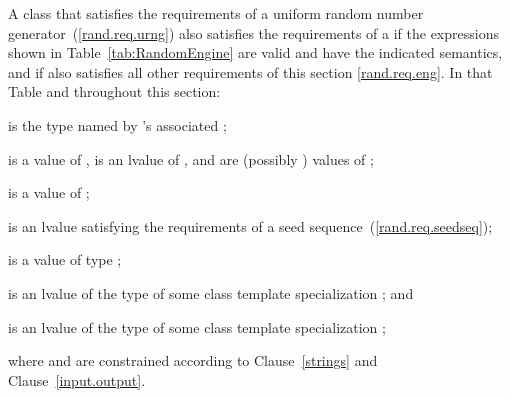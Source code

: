 \pnum
A class 
that satisfies the requirements
of a uniform random number generator~(\ref{rand.req.urng})
also satisfies the requirements
of a 
if the expressions shown
in Table~\ref{tab:RandomEngine}
are valid and have the indicated semantics,
and if  also satisfies all other requirements
of this section \ref{rand.req.eng}.
In that Table and throughout this section:
\begin{enumeratea}
  \item
     is the type named by
    's associated ;
  \item
     is a value of ,
     is an lvalue of ,
     and  are (possibly ) values of ;
  \item
     is a value of ;
  \item
     is an lvalue
    satisfying the requirements of a seed sequence~(\ref{rand.req.seedseq});
  \item
     is a value
    of type ;
  \item
     is an lvalue of the type of some class template specialization
     ;
  and
  \item
     is an lvalue of the type of some class template specialization
     ;
\end{enumeratea}
where  and  are constrained
according to Clause~\ref{strings} and Clause~\ref{input.output}.

